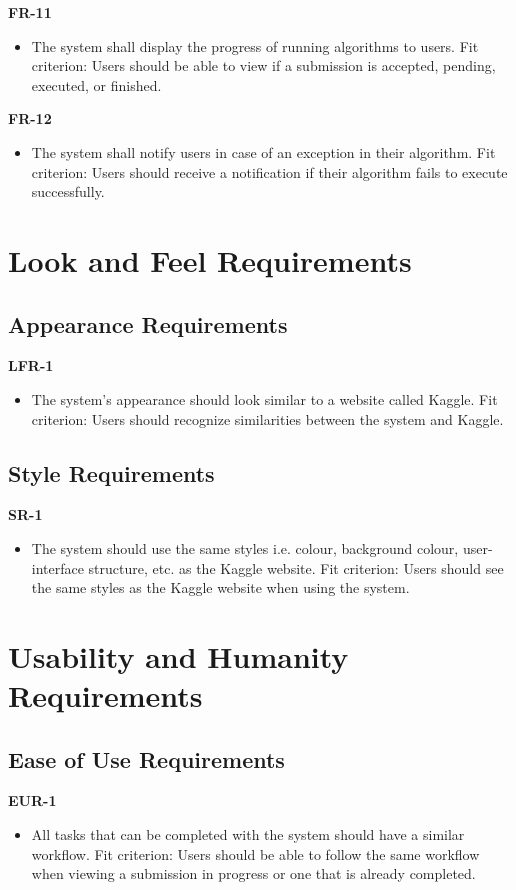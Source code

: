 \documentclass[12pt]{article}
\begin{document}
\textbf{FR-11}
\begin{itemize}
    \item The system shall display the progress of running algorithms to users. \hfill \break
    Fit criterion: Users should be able to view if a submission is accepted, pending, executed, or finished.
\end{itemize}
\textbf{FR-12}
\begin{itemize}
    \item The system shall notify users in case of an exception in their algorithm. \hfill \break
    Fit criterion: Users should receive a notification if their algorithm fails to execute successfully.
\end{itemize}

\section{Look and Feel Requirements}
\subsection{Appearance Requirements}
\textbf{LFR-1}
\begin{itemize}
    \item The system’s appearance should look similar to a website called Kaggle. \hfill \break
    Fit criterion: Users should recognize similarities between the system and Kaggle.
\end{itemize}

\subsection{Style Requirements}
\textbf{SR-1}
\begin{itemize}
    \item The system should use the same styles i.e. colour, background colour, user-interface structure, etc. as the Kaggle website. \hfill \break
    Fit criterion: Users should see the same styles as the Kaggle website when using the system.
\end{itemize}


\section{Usability and Humanity Requirements}
\subsection{Ease of Use Requirements}
\textbf{EUR-1}
\begin{itemize}
    \item All tasks that can be completed with the system should have a similar workflow.\hfill \break
    Fit criterion: Users should be able to follow the same workflow when viewing a submission in progress or one that is already completed.
\end{itemize}
\end{document}
